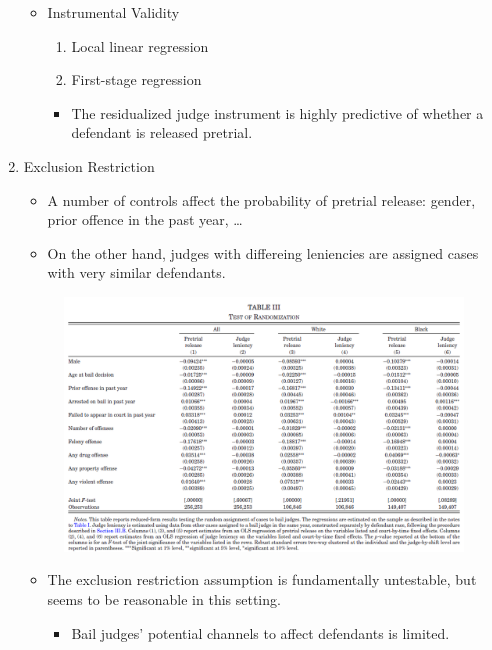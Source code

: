 \documentclass[../root]{subfiles}
\begin{document}
\begin{enumerate}
\begin{itemize}
        \item Instrumental Validity
        \begin{enumerate}
          \item Local linear regression
          \item First-stage regression
        \end{enumerate}
        \begin{itemize}
          \item The residualized judge instrument is highly predictive of whether a defendant is released pretrial.
        \end{itemize}
      \end{itemize}
      \item Exclusion Restriction
      \begin{itemize}
        \item A number of controls affect the probability of pretrial release: gender, prior offence in the past year, \dots
        \item On the other hand, judges with differeing leniencies are assigned cases with very similar defendants.
      \end{itemize}
      \begin{figure}[h]
        \centering
        \includegraphics[scale = .8]{os0707tanji/ADY_T3}
      \end{figure}
      \begin{itemize}
        \item The exclusion restriction assumption is fundamentally untestable, but seems to be reasonable in this setting.
        \begin{itemize}
          \item Bail judges' potential channels to affect defendants is limited.

\end{itemize}
\end{itemize}
\end{enumerate}
\end{document}
